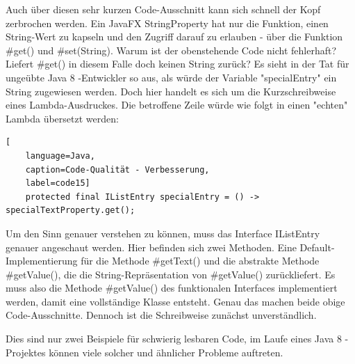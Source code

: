 Auch über diesen sehr kurzen Code-Ausschnitt kann sich schnell der Kopf zerbrochen werden. Ein JavaFX StringProperty hat nur die Funktion, einen String-Wert zu kapseln und den Zugriff darauf zu erlauben - über die Funktion \#get() und \#set(String). Warum ist der obenstehende Code nicht fehlerhaft? Liefert \#get() in diesem Falle doch keinen String zurück?
Es sieht in der Tat für ungeübte Java 8 -Entwickler so aus, als würde der Variable "specialEntry" ein String zugewiesen werden. Doch hier handelt es sich um die Kurzschreibweise eines Lambda-Ausdruckes. Die betroffene Zeile würde wie folgt in einen "echten" Lambda übersetzt werden:

\begin{lstlisting}[
    language=Java,
    caption=Code-Qualität - Verbesserung,
    label=code15]
	protected final IListEntry specialEntry = () -> specialTextProperty.get();
\end{lstlisting}

Um den Sinn genauer verstehen zu können, muss das Interface IListEntry genauer angeschaut werden. Hier befinden sich zwei Methoden. Eine Default-Implementierung für die Methode \#getText() und die abstrakte Methode \#getValue(), die die String-Repräsentation von \#getValue() zurückliefert. Es muss also die Methode \#getValue() des funktionalen Interfaces implementiert werden, damit eine vollständige Klasse entsteht. Genau das machen beide obige Code-Ausschnitte. Dennoch ist die Schreibweise zunächst unverständlich.

Dies sind nur zwei Beispiele für schwierig lesbaren Code, im Laufe eines Java 8 -Projektes können viele solcher und ähnlicher Probleme auftreten.
